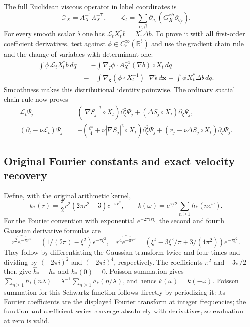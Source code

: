 The full Euclidean viscous operator in label coordinates is
\[
 G_X=A_X^{-1}A_X^{-\mathsf T},\qquad
 \mathcal L_t=\sum_{\alpha,\beta}
       \partial_{q_\alpha}(G_X^{\alpha\beta}\partial_{q_\beta}).
\]
For every smooth scalar $b$ one has
$\mathcal L_tX_t^*b=X_t^*\Delta b$. To prove it with all
first-order coefficient derivatives, test against
$\phi\in C_c^\infty(\mathbb R^3)$ and use the gradient chain
rule and the change of variables with determinant one:
\[
\begin{aligned}
 \int\phi\,\mathcal L_tX_t^*b\,dq
 &=-\int\nabla_q\phi\cdot A_X^{-1}(\nabla b)\circ X_t\,dq\\
 &=-\int\nabla_{\mathbf x}(\phi\circ X_t^{-1})\cdot\nabla b\,d\mathbf x
 =\int\phi\,X_t^*\Delta b\,dq .
\end{aligned}
\]
Smoothness makes this distributional identity pointwise.
The ordinary spatial chain rule now proves
\begin{equation}
\begin{aligned}
 \mathcal L_t\Psi_j
 &=(|\nabla S_j|^2\circ X_t)\partial_\zeta^2\Psi_j
        +(\Delta S_j\circ X_t)\partial_\zeta\Psi_j,\\
 (\partial_t-\nu\mathcal L_t)\Psi_j
 &=-\left(\frac{\vartheta'}4+\nu|\nabla S_j|^2\circ X_t\right)
          \partial_\zeta^2\Psi_j
       +(v_j-\nu\Delta S_j\circ X_t)\partial_\zeta\Psi_j .
\end{aligned}
\label{eq:cq-NS-material-viscous-residual}
\end{equation}

\subsection{Original Fourier constants and exact velocity recovery}

Define, with the original arithmetic kernel,
\[
 h_*(r)=\frac{\pi}{2}r^2(2\pi r^2-3)e^{-\pi r^2},\qquad
 k(\omega)=e^{\omega/2}\sum_{n\geq1}h_*(ne^\omega).
\]
For the Fourier convention with exponential $e^{-2\pi ir\xi}$,
the second and fourth Gaussian derivative formulas are
\[
 \widehat{r^2e^{-\pi r^2}}
   =(1/(2\pi)-\xi^2)e^{-\pi\xi^2},\quad
 \widehat{r^4e^{-\pi r^2}}
   =(\xi^4-3\xi^2/\pi+3/(4\pi^2))e^{-\pi\xi^2}.
\]
They follow by differentiating the Gaussian transform twice
and four times and dividing by $(-2\pi i)^2$ and
$(-2\pi i)^4$, respectively. The coefficients
$\pi^2$ and $-3\pi/2$ then give $\widehat h_*=h_*$ and
$h_*(0)=0$. Poisson summation gives
$\sum_{n\geq1}h_*(n\lambda)
=\lambda^{-1}\sum_{n\geq1}h_*(n/\lambda)$, and hence
$k(\omega)=k(-\omega)$. Poisson summation for this Schwartz
function follows directly by periodizing it: its Fourier
coefficients are the displayed Fourier transform at integer
frequencies; the function and coefficient series converge
absolutely with derivatives, so evaluation at zero is valid.

